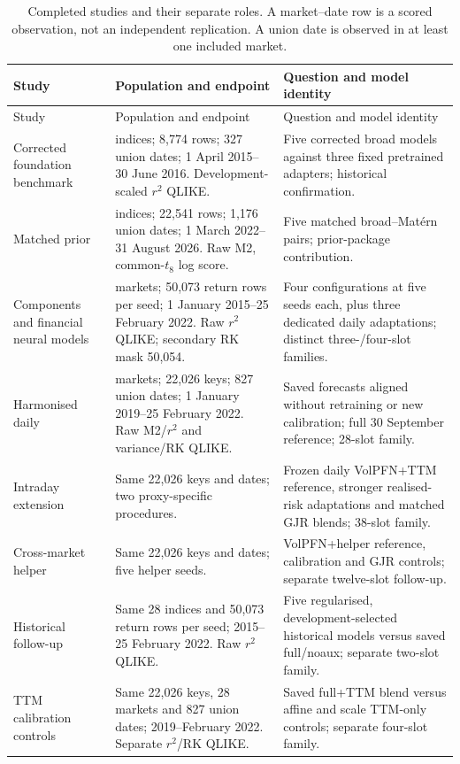 \begin{longtable}{@{}>{\raggedright\arraybackslash}p{2.7cm}>{\raggedright\arraybackslash}p{5.5cm}>{\raggedright\arraybackslash}p{6.4cm}@{}}
\caption[Map of the completed studies]{Completed studies and their separate roles. A market--date row is a scored observation, not an independent replication. A union date is observed in at least one included market.}\label{tab:study_map}\\
\toprule Study & Population and endpoint & Question and model identity \\
\midrule\endfirsthead
\toprule Study & Population and endpoint & Question and model identity \\
\midrule\endhead
Corrected foundation benchmark & 28 indices; 8,774 rows; 327 union dates; 1 April 2015--30 June 2016. Development-scaled $r^2$ QLIKE. & Five corrected broad models against three fixed pretrained adapters; historical confirmation. \\
Matched prior & 20 indices; 22,541 rows; 1,176 union dates; 1 March 2022--31 August 2026. Raw M2, common-$t_8$ log score. & Five matched broad--Mat\'ern pairs; prior-package contribution. \\
Components and financial neural models & 28 markets; 50,073 return rows per seed; 1 January 2015--25 February 2022. Raw $r^2$ QLIKE; secondary RK mask 50,054. & Four configurations at five seeds each, plus three dedicated daily adaptations; distinct three-/four-slot families. \\
Harmonised daily & 28 markets; 22,026 keys; 827 union dates; 1 January 2019--25 February 2022. Raw M2/$r^2$ and variance/RK QLIKE. & Saved forecasts aligned without retraining or new calibration; full 30 September reference; 28-slot family. \\
Intraday extension & Same 22,026 keys and dates; two proxy-specific procedures. & Frozen daily VolPFN+TTM reference, stronger realised-risk adaptations and matched GJR blends; 38-slot family. \\
Cross-market helper & Same 22,026 keys and dates; five helper seeds. & VolPFN+helper reference, calibration and GJR controls; separate twelve-slot follow-up. \\
Historical follow-up & Same 28 indices and 50,073 return rows per seed; 2015--25 February 2022. Raw $r^2$ QLIKE. & Five regularised, development-selected historical models versus saved full/noaux; separate two-slot family. \\
TTM calibration controls & Same 22,026 keys, 28 markets and 827 union dates; 2019--February 2022. Separate $r^2$/RK QLIKE. & Saved full+TTM blend versus affine and scale TTM-only controls; separate four-slot family. \\

\end{longtable}
